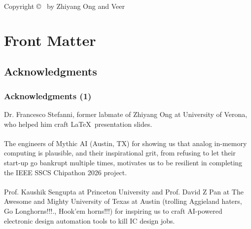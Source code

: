 \documentclass[xcolor={usenames,dvipsnames},hyperref={hyperindex,bookmarks}]{beamer}
\begin{document}

\begin{frame}
	\begin{center} 
	Copyright \copyright\ \the\year{} by Zhiyang Ong and Veer
	\end{center}
	\doclicenseThis
\end{frame}





\section{Front Matter}

\subsection{Acknowledgments}

\begin{frame}
	\frametitle{Acknowledgments (1)}
	Dr. Francesco Stefanni, former labmate of Zhiyang Ong at University of Verona, who helped him craft \LaTeX\ presentation slides. \\
	\ \\
	The engineers of Mythic AI (Austin, TX) for showing us that analog in-memory computing is plausible, and their inspirational grit, from refusing to let their start-up go bankrupt multiple times, motivates us to be resilient in completing the IEEE SSCS Chipathon 2026 project. \\
	\ \\
	Prof. Kaushik Sengupta at Princeton University and Prof. David Z Pan at The Awesome and Mighty University of Texas at Austin (trolling Aggieland haters, Go Longhorns!!!., Hook'em horns!!!) for inspiring us to craft AI-powered electronic design automation tools to kill IC design jobs.
\end{frame}
\end{document}
